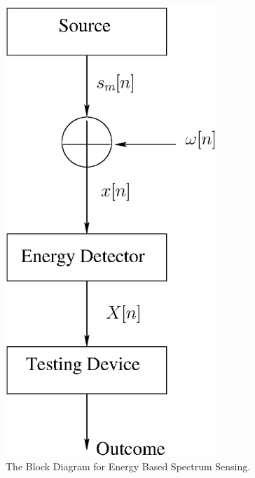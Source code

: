 \documentclass[12pt,journal,a4paper,twoside,doublecolumn]{IEEEtran}
\begin{document}
\begin{spacing}{1.0}
\begin{figure}[!t]
\centering
\includegraphics[width=8cm]{fig1.eps}
\caption{The Block Diagram for Energy Based Spectrum Sensing.}
\label{pic: block diagram}
\end{figure}


\end{spacing}
\end{document}
